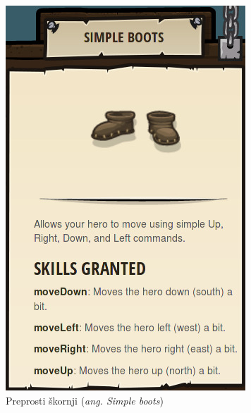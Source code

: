 \begin{figure}[h!]
    \centering
    \begin{subfigure}[]{0.25\textwidth}
      \includegraphics[width=\textwidth]{./images/sc_web/cc_EQ-SB-v01.jpg}
        \caption{Preprosti škornji (\emph{ang. Simple boots})}
        \label{fig:cc:eq:sb}
      \end{subfigure}
      \qquad
    \begin{subfigure}[]{0.25\textwidth}

\end{subfigure}
\end{figure}

